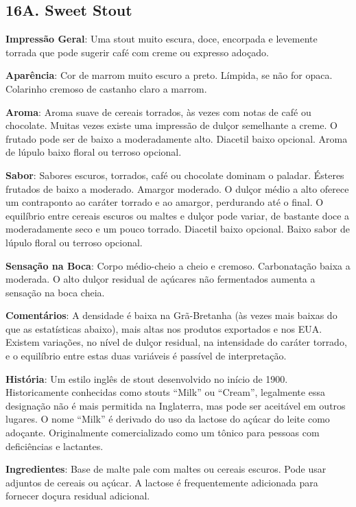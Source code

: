 \subsection*{16A. Sweet Stout}

\textbf{Impressão Geral}: Uma stout muito escura, doce, encorpada e levemente torrada que pode sugerir café com creme ou expresso adoçado.

\textbf{Aparência}: Cor de marrom muito escuro a preto. Límpida, se não for opaca. Colarinho cremoso de castanho claro a marrom.

\textbf{Aroma}: Aroma suave de cereais torrados, às vezes com notas de café ou chocolate. Muitas vezes existe uma impressão de dulçor semelhante a creme. O frutado pode ser de baixo a moderadamente alto. Diacetil baixo opcional. Aroma de lúpulo baixo floral ou terroso opcional.

\textbf{Sabor}: Sabores escuros, torrados, café ou chocolate dominam o paladar. Ésteres frutados de baixo a moderado. Amargor moderado. O dulçor médio a alto oferece um contraponto ao caráter torrado e ao amargor, perdurando até o final. O equilíbrio entre cereais escuros ou maltes e dulçor pode variar, de bastante doce a moderadamente seco e um pouco torrado. Diacetil baixo opcional. Baixo sabor de lúpulo floral ou terroso opcional.

\textbf{Sensação na Boca}: Corpo médio-cheio a cheio e cremoso. Carbonatação baixa a moderada. O alto dulçor residual de açúcares não fermentados aumenta a sensação na boca cheia.

\textbf{Comentários}: A densidade é baixa na Grã-Bretanha (às vezes mais baixas do que as estatísticas abaixo), mais altas nos produtos exportados e nos EUA. Existem variações, no nível de dulçor residual, na intensidade do caráter torrado, e o equilíbrio entre estas duas variáveis é passível de interpretação.

\textbf{História}: Um estilo inglês de stout desenvolvido no início de 1900. Historicamente conhecidas como stouts “Milk” ou “Cream”, legalmente essa designação não é mais permitida na Inglaterra, mas pode ser aceitável em outros lugares. O nome “Milk” é derivado do uso da lactose do açúcar do leite como adoçante. Originalmente comercializado como um tônico para pessoas com deficiências e lactantes.

\textbf{Ingredientes}: Base de malte pale com maltes ou cereais escuros. Pode usar adjuntos de cereais ou açúcar. A lactose é frequentemente adicionada para fornecer doçura residual adicional.

